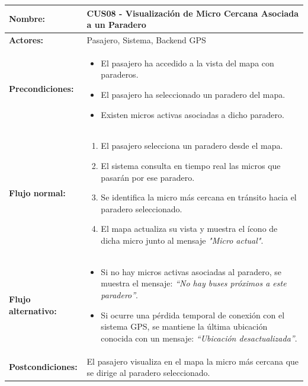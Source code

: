 \documentclass[12pt]{article}
\begin{document}
    \clearpage
    \begin{table}[!h]
    \centering
    \begin{tabular}{|p{3.5cm}|p{11cm}|}
    \hline
    \textbf{Nombre:} & CUS08 - Visualización de Micro Cercana Asociada a un Paradero \\
    \hline
    \textbf{Actores:} & Pasajero, Sistema, Backend GPS \\
    \hline
    \textbf{Precondiciones:} &
    \begin{itemize}
        \item El pasajero ha accedido a la vista del mapa con paraderos.
        \item El pasajero ha seleccionado un paradero del mapa.
        \item Existen micros activas asociadas a dicho paradero.
    \end{itemize}
    \\
    \hline
    \textbf{Flujo normal:} &
    \begin{enumerate}
        \item El pasajero selecciona un paradero desde el mapa.
        \item El sistema consulta en tiempo real las micros que pasarán por ese paradero.
        \item Se identifica la micro más cercana en tránsito hacia el paradero seleccionado.
        \item El mapa actualiza su vista y muestra el ícono de dicha micro junto al mensaje \textit{"Micro actual"}.
    \end{enumerate}
    \\
    \hline
    \textbf{Flujo alternativo:} &
    \begin{itemize}
        \item[2a.] Si no hay micros activas asociadas al paradero, se muestra el mensaje: \textit{“No hay buses próximos a este paradero”}.
        \item[3a.] Si ocurre una pérdida temporal de conexión con el sistema GPS, se mantiene la última ubicación conocida con un mensaje: \textit{“Ubicación desactualizada”}.
    \end{itemize}
    \\
    \hline
    \textbf{Postcondiciones:} &
    El pasajero visualiza en el mapa la micro más cercana que se dirige al paradero seleccionado.
    \\
    \hline
    \end{tabular}
    \end{table}
\end{document}
